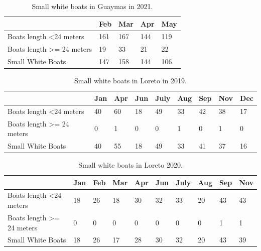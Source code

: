 \begin{table}[h!]
\begin{tabular}{|l|l|l|l|l|}
\hline
                                       & Feb & Mar & Apr & May \\ \hline
Boats length \textless 24 meters       & 161 & 167 & 144 & 119 \\ \hline
Boats length \textgreater{}= 24 meters & 19  & 33  & 21  & 22  \\ \hline
Small White Boats                      & 147 & 158 & 144 & 106 \\ \hline
\end{tabular}
\caption{Small white boats in Guaymas in 2021.}
\end{table}


\begin{table}[h!]
\begin{tabular}{|l|l|l|l|l|l|l|l|l|}
\hline
                                       & Jan & Apr & Jun & July & Aug & Sep & Nov & Dec \\ \hline
Boats length \textless 24 meters       & 40  & 60  & 18  & 49   & 33  & 42  & 38  & 17  \\ \hline
Boats length \textgreater{}= 24 meters & 0   & 1   & 0   & 0    & 1   & 0   & 1   & 0   \\ \hline
Small White Boats                      & 40  & 55  & 18  & 49   & 33  & 41  & 37  & 16  \\ \hline
\end{tabular}
\caption{Small white boats in Loreto in 2019.}
\end{table}


\begin{table}[h!]
\begin{tabular}{|l|l|l|l|l|l|l|l|l|l|}
\hline
                                       & Jan & Feb & Mar & Apr & Jun & July & Aug & Sep & Nov \\ \hline
Boats length \textless 24 meters       & 18  & 26  & 18  & 30  & 32  & 33   & 20  & 43  & 43  \\ \hline
Boats length \textgreater{}= 24 meters & 0   & 0   & 0   & 0   & 0   & 0    & 0   & 1   & 1   \\ \hline
Small White Boats                      & 18  & 26  & 17  & 28  & 30  & 32   & 20  & 43  & 39  \\ \hline
\end{tabular}
\caption{Small white boats in Loreto 2020.}
\end{table}



